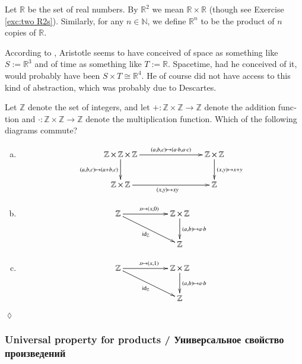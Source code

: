 \documentclass{book}
\def\tn{\textnormal}
\def\ZZ{{\mathbb Z}}
\def\RR{{\mathbb R}}
\def\NN{{\mathbb N}}
\def\hsp{\hspace{.3in}}
\def\to{\rightarrow}
\def\taking{\colon}
\def\iso{\cong}
\def\id{\tn{id}}
\theoremstyle{theoremENG}
\theoremstyle{lemmaENG}
\theoremstyle{propositionENG}
\theoremstyle{corollaryENG}
\theoremstyle{factENG}
\theoremstyle{remarkENG}
\newtheorem{remarkENG}[subsubsection]{\begin{english}Remark\end{english}}
\theoremstyle{exampleENG}
\newtheorem{exampleENG}[subsubsection]{\begin{english}Example\end{english}}
\theoremstyle{warningENG}
\theoremstyle{questionENG}
\theoremstyle{guessENG}
\theoremstyle{answerENG}
\theoremstyle{constructionENG}
\theoremstyle{rulesENG}
\theoremstyle{excENG}
\newtheorem{excENG}[subsubsection]{\begin{english}Exercise\end{english}}
\theoremstyle{appENG}
\theoremstyle{definitionENG}
\theoremstyle{notationENG}
\theoremstyle{conjectureENG}
\theoremstyle{postulateENG}
\newenvironment{exerciseENG}{\begin{excENG}}{\hspace*{\fill}$\lozenge$\end{excENG}}
\theoremstyle{theoremRUS}
\theoremstyle{lemmaRUS}
\theoremstyle{propositionRUS}
\theoremstyle{corollaryRUS}
\theoremstyle{factRUS}
\theoremstyle{remarkRUS}
\theoremstyle{exampleRUS}
\theoremstyle{warningRUS}
\theoremstyle{questionRUS}
\theoremstyle{guessRUS}
\theoremstyle{answerRUS}
\theoremstyle{constructionRUS}
\theoremstyle{rulesRUS}
\theoremstyle{excRUS}
\theoremstyle{appRUS}
\theoremstyle{definitionRUS}
\theoremstyle{notationRUS}
\theoremstyle{conjectureRUS}
\theoremstyle{postulateRUS}
\def\sexc{\begin{enumerate}[a.)]\setlength{\itemsep}{.1cm}\setlength{\parskip}{.1cm}\item}
\def\next{\item}
\def\endsexc{\end{enumerate}}
\begin{document}
\begin{english}
\begin{remarkENG}
\begin{russian} \end{russian}

\end{remarkENG}

\begin{exampleENG}\label{ex:R2}

Let $\RR$\index{a symbol!$\RR$} be the set of real numbers. By $\RR^2$ we mean $\RR\times\RR$ (though see Exercise \ref{exc:two R2s}). Similarly, for any $n\in\NN$, we define $\RR^n$ to be the product of $n$ copies of $\RR$. 

According to \cite{Pen}, Aristotle seems to have conceived of space as something like $S:=\RR^3$ and of time as something like $T:=\RR$. Spacetime, had he conceived of it, would probably have been $S\times T\iso\RR^4$. He of course did not have access to this kind of abstraction, which was probably due to Descartes. 

\begin{russian} \end{russian}

\end{exampleENG}

\begin{exerciseENG}

Let $\ZZ$ denote the set of integers, and let $+\taking\ZZ\times\ZZ\to\ZZ$ denote the addition function and $\cdot\taking\ZZ\times\ZZ\to\ZZ$ denote the multiplication function. Which of the following diagrams commute?
\sexc $$\xymatrix{
\ZZ\times\ZZ\times\ZZ\ar[rr]^-{(a,b,c)\mapsto(a\cdot b,a\cdot c)}\ar[d]_{(a,b,c)\mapsto(a+b,c)}&\hsp&\ZZ\times\ZZ\ar[d]^{(x,y)\mapsto x+y}\\
\ZZ\times\ZZ\ar[rr]_{(x,y)\mapsto xy}&&\ZZ}
$$
\next $$
\xymatrix{
\ZZ\ar[rr]^{x\mapsto (x,0)}\ar[drr]_{\id_\ZZ}&&\ZZ\times\ZZ\ar[d]^{(a,b)\mapsto a\cdot b}\\&&\ZZ}
$$
\next$$
\xymatrix{
\ZZ\ar[rr]^{x\mapsto (x,1)}\ar[drr]_{\id_\ZZ}&&\ZZ\times\ZZ\ar[d]^{(a,b)\mapsto a\cdot b}\\&&\ZZ}
$$
\endsexc

\begin{russian} \end{russian}

\end{exerciseENG}


\subsubsection{Universal property for products / Универсальное свойство произведений}


\end{english}
\end{document}
